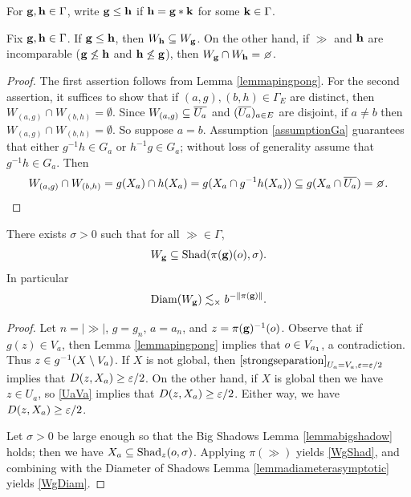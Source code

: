 For $\gg,\hh\in\Gamma$, write $\gg \leq \hh$ if $\hh = \gg\ast\kk$ for some $\kk\in\Gamma$.

\begin{lemma}
\label{lemmaincomparable}
Fix $\gg,\hh\in\Gamma$. If $\gg\leq \hh$, then $W_\hh\subset W_\gg$. On the other hand, if $\gg$ and $\hh$ are incomparable ($\gg\not\leq\hh$ and $\hh\not\leq\gg$), then $W_\gg\cap W_\hh = \emptyset$.
\end{lemma}
\begin{proof}
The first assertion follows from Lemma \ref{lemmapingpong}. For the second assertion, it suffices to show that if $(a,g),(b,h)\in \Gamma_E$ are distinct, then $W_{(a,g)}\cap W_{(b,h)} = \emptyset$. Since $W_{(a,g)} \subset \schottkycl{U_a}$ and $(\schottkycl{U_a})_{a\in E}$ are disjoint, if $a\neq b$ then $W_{(a,g)}\cap W_{(b,h)} = \emptyset$. So suppose $a = b$. Assumption \ref{assumptionGa} guarantees that either $g^{-1}h\in G_a$ or $h^{-1}g\in G_a$; without loss of generality assume that $g^{-1}h\in G_a$. Then
\[
W_{(a,g)}\cap W_{(b,h)} = g(X_a)\cap h(X_a) = g(X_a\cap g^{-1}h(X_a)) \subset g(X_a\cap \schottkycl{U_a}) = \emptyset.
\]
\end{proof}





\begin{lemma}
\label{lemmastrongseparation2}
There exists $\sigma > 0$ such that for all $\gg\in \Gamma$,
\begin{equation}
\label{WgShad}
W_\gg \subset \Shad(\pi(\gg)(\zero),\sigma).
\end{equation}
In particular
\begin{equation}
\label{WgDiam}
\Diam(W_\gg) \lesssim_\times b^{-\dogo{\pi(\gg)}}.
\end{equation}
\end{lemma}
\begin{proof}
Let $n = |\gg|$, $g = g_n$, $a = a_n$, and $z = \pi(\gg)^{-1}(\zero)$. Observe that if $g(z)\in V_a$, then Lemma \ref{lemmapingpong} implies that $\zero\in V_{a_1}$, a contradiction. Thus $z\in g^{-1}(X\butnot V_a)$. If $X$ is not global, then $\eqref{strongseparation}_{U_a = V_a, \epsilon = \epsilon/2}$ implies that $\Dist(z,X_a) \geq \epsilon/2$. On the other hand, if $X$ is global then we have $z\in U_a$, so \eqref{UaVa} implies that $\Dist(z,X_a) \geq \epsilon/2$. Either way, we have $\Dist(z,X_a) \geq \epsilon/2$.

Let $\sigma > 0$ be large enough so that the Big Shadows Lemma \ref{lemmabigshadow} holds; then we have $X_a \subset \Shad_z(\zero,\sigma)$. Applying $\pi(\gg)$ yields \eqref{WgShad}, and combining with the Diameter of Shadows Lemma \ref{lemmadiameterasymptotic} yields \eqref{WgDiam}.
\end{proof}



